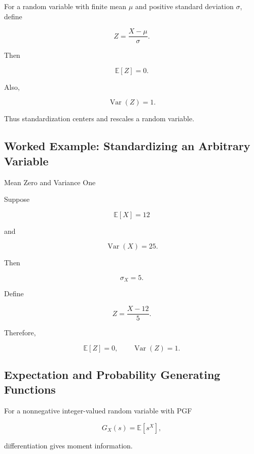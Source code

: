For a random variable with finite mean \(\mu\) and positive standard
deviation \(\sigma\), define

\[
\boxed{
Z
=
\frac{X-\mu}{\sigma}.
}
\]

Then

\[
\boxed{
\mathbb{E}[Z]=0.
}
\]

Also,

\[
\boxed{
\operatorname{Var}(Z)=1.
}
\]

Thus standardization centers and rescales a random variable.

\subsection{Worked Example: Standardizing an Arbitrary Variable}
\label{subsec:worked-standardization-general}

\begin{workedexamplebox}{Mean Zero and Variance One}

Suppose

\[
\mathbb{E}[X]=12
\]

and

\[
\operatorname{Var}(X)=25.
\]

Then

\[
\sigma_X=5.
\]

Define

\[
Z
=
\frac{X-12}{5}.
\]

Therefore,

\begin{answerbox}
\[
\boxed{
\mathbb{E}[Z]=0,
\qquad
\operatorname{Var}(Z)=1.
}
\]
\end{answerbox}

\end{workedexamplebox}

\subsection{Expectation and Probability Generating Functions}
\label{subsec:expectation-pgf-preview}

For a nonnegative integer-valued random variable with PGF

\[
G_X(s)
=
\mathbb{E}[s^X],
\]

differentiation gives moment information.

